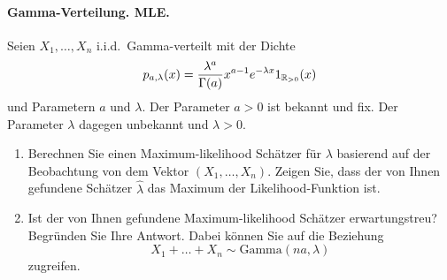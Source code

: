 


\paragraph{Gamma-Verteilung. MLE.} Seien $X_1, \ldots,
X_n$ i.i.d.\ Gamma-verteilt mit der Dichte
\begin{equation*}
    p_{a,\lambda}(x) = \frac{\lambda^a}{\Gamma(a)}x^{a-1}e^{-\lambda x} 1_{\mathbb R_{>0}}(x)
\end{equation*}
und Parametern $a$ und $\lambda$. Der Parameter $a>0$ ist bekannt und fix. 
Der Parameter $\lambda$ dagegen unbekannt und $\lambda > 0$.
\begin{enumerate}
    \item Berechnen Sie einen Maximum-likelihood Schätzer für $\lambda$ 
        basierend auf der Beobachtung von dem Vektor
        $(X_1, \ldots, X_n)$. Zeigen Sie, dass der von Ihnen gefundene Schätzer 
        $\hat \lambda$ das Maximum der Likelihood-Funktion ist.
    \item Ist der von Ihnen gefundene Maximum-likelihood Schätzer erwartungstreu? 
        Begründen Sie Ihre Antwort. Dabei können Sie auf die Beziehung 
        \begin{equation*}
            X_1+ \ldots + X_n \sim \textrm{Gamma}(na,\lambda)
        \end{equation*}
        zugreifen.
\end{enumerate}

